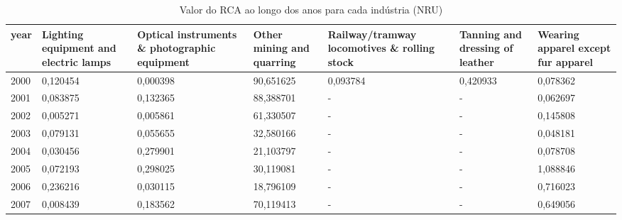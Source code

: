 \begin{table}
\centering
\caption{Valor do RCA ao longo dos anos para cada indústria (NRU)}
\begin{tabular}{p{1cm}p{2cm}p{2cm}p{2cm}p{2cm}p{2cm}p{2cm}}
\toprule
 year &  Lighting equipment and electric lamps &  Optical instruments \& photographic equipment &  Other mining and quarring &  Railway/tramway locomotives \& rolling stock &  Tanning and dressing of leather &  Wearing apparel except fur apparel \\
\midrule
 2000 &                               0,120454 &                                      0,000398 &                  90,651625 &                                     0,093784 &                         0,420933 &                            0,078362 \\
 2001 &                               0,083875 &                                      0,132365 &                  88,388701 &                                            - &                                - &                            0,062697 \\
 2002 &                               0,005271 &                                      0,005861 &                  61,330507 &                                            - &                                - &                            0,145808 \\
 2003 &                               0,079131 &                                      0,055655 &                  32,580166 &                                            - &                                - &                            0,048181 \\
 2004 &                               0,030456 &                                      0,279901 &                  21,103797 &                                            - &                                - &                            0,078708 \\
 2005 &                               0,072193 &                                      0,298025 &                  30,119081 &                                            - &                                - &                            1,088846 \\
 2006 &                               0,236216 &                                      0,030115 &                  18,796109 &                                            - &                                - &                            0,716023 \\
 2007 &                               0,008439 &                                      0,183562 &                  70,119413 &                                            - &                                - &                            0,649056 \\

\end{tabular}
\end{table}
